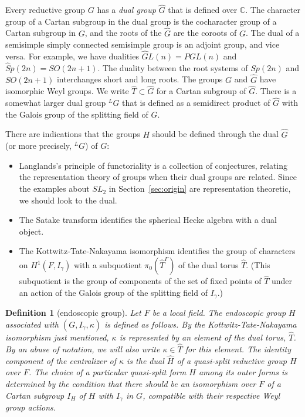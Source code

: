 \documentclass[brochure,english,12pt]{bourbaki}
\theoremstyle{plain}
\newtheorem{definition}[equation]{Definition}
\newcommand{\ring}[1]{\mathbb{#1}}
\begin{document}
Every reductive group $G$ has a {\it dual group} $\hat G$ that is defined over $\ring{C}$.
The character group of a Cartan subgroup in the
dual group is the cocharacter group of a Cartan subgroup in $G$, and
the roots of the $\hat G$ are the coroots of $G$.  The dual of a
semisimple simply connected semisimple group is an adjoint group, and
vice versa.  For example, we have dualities $\hat GL(n) = PGL(n)$ and
$\hat Sp(2n)=SO(2n+1)$.  The duality between the root systems of
$Sp(2n)$ and $SO(2n+1)$ interchanges short and long roots.  The groups
$G$ and $\hat G$ have isomorphic Weyl groups.  We write $\hat T\subset
\hat G$ for a Cartan subgroup of $\hat G$.  There is a somewhat larger
dual group ${}^LG$ that is defined as a semidirect product of $\hat G$
with the Galois group of the splitting field of $G$.

There are indications that the groups $H$ should be defined through  
the dual $\hat G$ (or more precisely, ${}^LG$) of $G$:
\begin{itemize}
\item Langlands's principle of functoriality is a collection of
  conjectures, relating  the representation theory of groups
  when their dual groups are related.  Since the
  examples about $SL_2$ in Section~\ref{sec:origin} are representation
  theoretic, we should look to the dual.
\item The Satake transform identifies the spherical Hecke algebra with
  a dual object.  
\item The Kottwitz-Tate-Nakayama isomorphism identifies the group of
  characters on $H^1(F,I_\gamma)$ with a subquotient $\pi_0(\hat T^\Gamma)$
  of the dual torus $\hat T$.  (This subquotient is the group of
  components of the set of fixed points of $\hat T$ under an action of the Galois group of the
splitting field of $I_\gamma$.)
\end{itemize}

\begin{definition}[endoscopic group]  Let $F$ be a local field.
  The {\it endoscopic group} $H$ associated with $(G,I_\gamma,\kappa)$ is defined
  as follows.  By the Kottwitz-Tate-Nakayama isomorphism just
  mentioned, $\kappa$ is represented by an element of the dual torus,
  $\hat T$.  By an abuse of notation, we will also write $\kappa\in
  \hat T$ for this element.  The identity component of the
  centralizer of $\kappa$ is the dual $\hat H$ of a quasi-split
  reductive group $H$ over $F$.  The choice of a particular quasi-split form $H$
  among its outer forms is determined by the condition that there should
  be an isomorphism over $F$ of a Cartan subgroup $I_H$ of $H$ with
  $I_\gamma$ in $G$, compatible with their respective Weyl group actions.
\end{definition}
\end{document}

